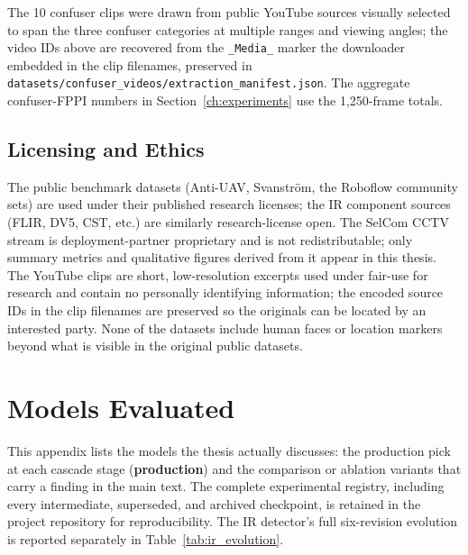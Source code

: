 \noindent The 10 confuser clips were drawn from public YouTube sources visually selected to span the three confuser categories at multiple ranges and viewing angles; the video IDs above are recovered from the \texttt{\_Media\_} marker the downloader embedded in the clip filenames, preserved in \texttt{datasets/confuser\_videos/extraction\_manifest.json}. The aggregate confuser-FPPI numbers in Section~\ref{ch:experiments} use the 1{,}250-frame totals.

\section{Licensing and Ethics}

The public benchmark datasets (Anti-UAV, Svanstr\"om, the Roboflow community sets) are used under their published research licenses; the IR component sources (FLIR, DV5, CST, etc.) are similarly research-license open. The SelCom CCTV stream is deployment-partner proprietary and is not redistributable; only summary metrics and qualitative figures derived from it appear in this thesis. The YouTube clips are short, low-resolution excerpts used under fair-use for research and contain no personally identifying information; the encoded source IDs in the clip filenames are preserved so the originals can be located by an interested party. None of the datasets include human faces or location markers beyond what is visible in the original public datasets.

\chapter{Models Evaluated}
\label{app:models}

This appendix lists the models the thesis actually discusses: the production pick at each cascade stage (\textbf{production}) and the comparison or ablation variants that carry a finding in the main text. The complete experimental registry, including every intermediate, superseded, and archived checkpoint, is retained in the project repository for reproducibility. The IR detector's full six-revision evolution is reported separately in Table~\ref{tab:ir_evolution}.

